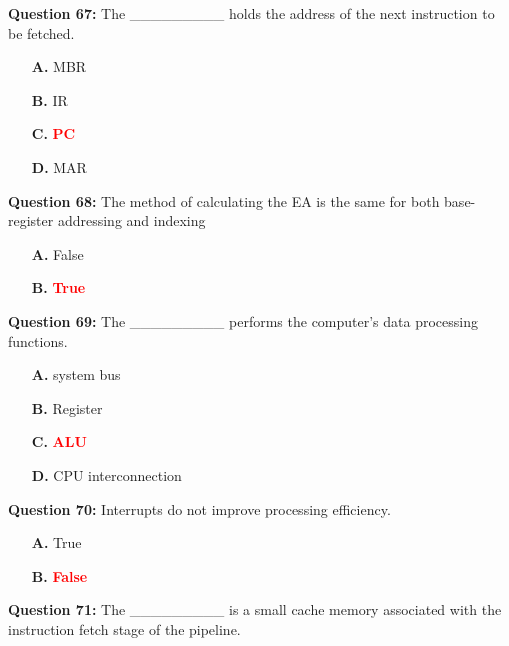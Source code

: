 \documentclass[12pt,a4paper]{article}
\begin{document}
\vspace{0.5cm}

\textbf{Question 67:} The _________ holds the address of the next instruction to be fetched.

\begin{itemize}
    \item[\textbf{A.}] MBR
    \item[\textbf{B.}] IR
    \item[\textbf{C.}] \textcolor{red}{\textbf{PC}}
    \item[\textbf{D.}] MAR
\end{itemize}

\vspace{0.5cm}

\textbf{Question 68:} The method of calculating the EA is the same for both base-register addressing and indexing

\begin{itemize}
    \item[\textbf{A.}] False
    \item[\textbf{B.}] \textcolor{red}{\textbf{True}}
\end{itemize}

\vspace{0.5cm}

\textbf{Question 69:} The _________ performs the computer's data processing functions.

\begin{itemize}
    \item[\textbf{A.}] system bus
    \item[\textbf{B.}] Register
    \item[\textbf{C.}] \textcolor{red}{\textbf{ALU}}
    \item[\textbf{D.}] CPU interconnection
\end{itemize}

\vspace{0.5cm}

\textbf{Question 70:} Interrupts do not improve processing efficiency.

\begin{itemize}
    \item[\textbf{A.}] True
    \item[\textbf{B.}] \textcolor{red}{\textbf{False}}
\end{itemize}

\vspace{0.5cm}

\textbf{Question 71:} The _________ is a small cache memory associated with the instruction fetch stage of the pipeline.
\end{document}
